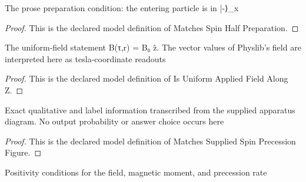 \begin{definition}
  \label{def:physics:phyx-mini-0543:phyxminiproblems-problemphyxmini0543-matchesspinhalfpreparation}
  The prose preparation condition: the entering particle is in |-⟩\_x
\end{definition}
\begin{proof}
  This is the declared model definition of Matches Spin Half Preparation.
\end{proof}
\begin{definition}
  \label{def:physics:phyx-mini-0543:phyxminiproblems-problemphyxmini0543-isuniformappliedfieldalongz}
  The uniform-field statement B(τ,r) = B₀ ẑ. The vector values of Physlib's field are interpreted here as tesla-coordinate readouts
\end{definition}
\begin{proof}
  This is the declared model definition of Is Uniform Applied Field Along Z.
\end{proof}
\begin{definition}
  \label{def:physics:phyx-mini-0543:phyxminiproblems-problemphyxmini0543-matchessuppliedspinprecessionfigure}
  Exact qualitative and label information transcribed from the supplied apparatus diagram. No output probability or answer choice occurs here
\end{definition}
\begin{proof}
  This is the declared model definition of Matches Supplied Spin Precession Figure.
\end{proof}
\begin{definition}
  \label{def:physics:phyx-mini-0543:phyxminiproblems-problemphyxmini0543-hasphysicalspinprecessionparameters}
  Positivity conditions for the field, magnetic moment, and precession rate
\end{definition}

